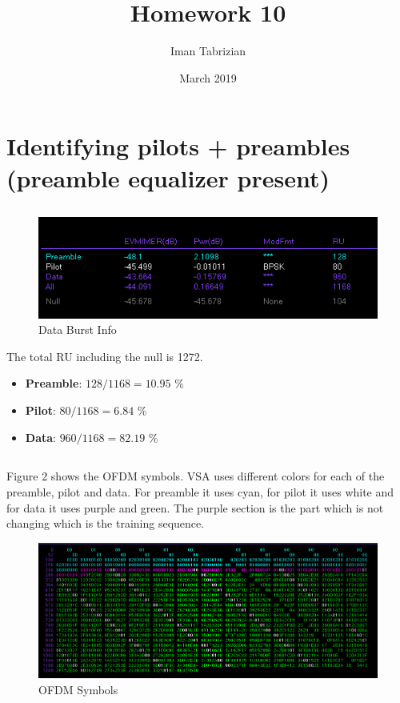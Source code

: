 \documentclass{article}
\title{Homework 10}
\author{Iman Tabrizian}
\date{March 2019}
\begin{document}
\begin{titlepage}
\maketitle
\end{titlepage}

\section{Identifying pilots + preambles (preamble equalizer present)}

\subsection{}

\begin{figure}[h]
    \centering
    \includegraphics{data-burst-info}
    \caption{Data Burst Info}
\end{figure}

The total RU including the null is 1272.

\begin{itemize}
    \item \textbf{Preamble}: $128 / 1168 = 10.95 $ \%
    \item \textbf{Pilot}: $80 / 1168 = 6.84$ \%
    \item \textbf{Data}: $960 / 1168 = 82.19$ \%
\end{itemize}

\subsection{}

Figure 2 shows the OFDM symbols. VSA uses different colors for each of the preamble, pilot and data. For preamble it uses cyan, for pilot it uses white and for data it uses purple and green. The purple section is the part which is not changing which is the training sequence.

\begin{figure}[htb!]
    \centering
    \includegraphics[scale=0.5]{symbols}
    \caption{OFDM Symbols}
\end{figure}
\end{document}
